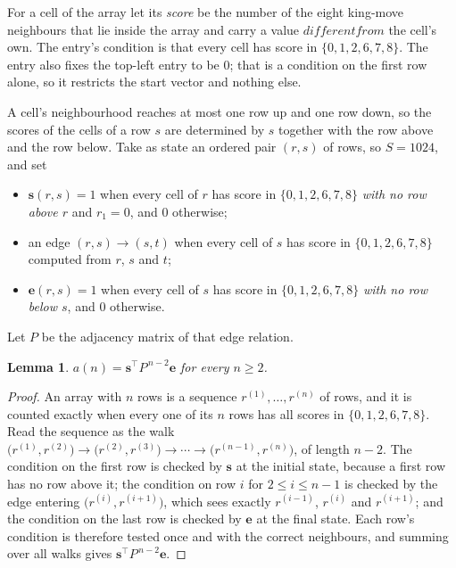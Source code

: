 \documentclass[11pt,a4paper]{article}
\theoremstyle{plain}
\newtheorem{lemma}[theorem]{Lemma}
\theoremstyle{definition}
\begin{document}
For a cell of the array let its \emph{score} be the number of the eight king-move neighbours that lie inside
the array and carry a value $different from$ the cell's own. The entry's condition is that every cell
has score in $\{0,1,2,6,7,8\}$. The entry also fixes the top-left entry to be $0$; that is a condition on the first row alone, so it restricts the start vector and nothing else.

A cell's neighbourhood reaches at most one row up and one row down, so the scores of the
cells of a row $s$ are determined by $s$ together with the row above and the row below.
Take as state an ordered pair $(r,s)$ of rows, so $S=1024$, and set
\begin{itemize}
\item $\mathbf{s}(r,s)=1$ when every cell of $r$ has score in $\{0,1,2,6,7,8\}$ \emph{with no row
above $r$} and $r_1=0$, and $0$ otherwise;
\item an edge $(r,s)\to(s,t)$ when every cell of $s$ has score in $\{0,1,2,6,7,8\}$ computed from
$r$, $s$ and $t$;
\item $\mathbf{e}(r,s)=1$ when every cell of $s$ has score in $\{0,1,2,6,7,8\}$ \emph{with no row
below $s$}, and $0$ otherwise.
\end{itemize}
Let $P$ be the adjacency matrix of that edge relation.

\begin{lemma}\label{lem:walk}
$a(n)=\mathbf{s}^{\!\top}P^{\,n-2}\mathbf{e}$ for every $n\ge2$.
\end{lemma}

\begin{proof}
An array with $n$ rows is a sequence $r^{(1)},\dots,r^{(n)}$ of rows, and it is counted
exactly when every one of its $n$ rows has all scores in $\{0,1,2,6,7,8\}$. Read the sequence as the
walk $\bigl(r^{(1)},r^{(2)}\bigr)\to\bigl(r^{(2)},r^{(3)}\bigr)\to\cdots\to
\bigl(r^{(n-1)},r^{(n)}\bigr)$, of length $n-2$. The condition on the first row is
checked by $\mathbf{s}$ at the initial state, because a first row has no row above it; the
condition on row $i$ for $2\le i\le n-1$ is checked by the edge entering
$\bigl(r^{(i)},r^{(i+1)}\bigr)$, which sees exactly $r^{(i-1)}$, $r^{(i)}$ and
$r^{(i+1)}$; and the condition on the last row is checked by $\mathbf{e}$ at the final
state. Each row's condition is therefore tested once and with the correct neighbours, and
summing over all walks gives $\mathbf{s}^{\!\top}P^{\,n-2}\mathbf{e}$.
\end{proof}
\end{document}
